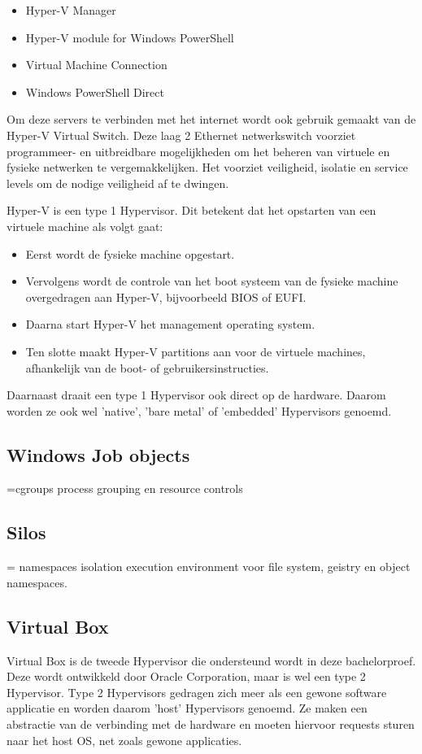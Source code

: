 \begin{itemize}[noitemsep]
	\item Hyper-V Manager
	\item Hyper-V module for Windows PowerShell
	\item Virtual Machine Connection
	\item Windows PowerShell Direct
\end{itemize}

Om deze servers te verbinden met het internet wordt ook gebruik gemaakt van de Hyper-V Virtual Switch. Deze laag 2 Ethernet netwerkswitch voorziet programmeer- en uitbreidbare mogelijkheden om het beheren van virtuele en fysieke netwerken te vergemakkelijken. Het voorziet veiligheid, isolatie en service levels om de nodige veiligheid af te dwingen.

Hyper-V is een type 1 Hypervisor. Dit betekent dat het opstarten van een virtuele machine als volgt gaat:
\begin{itemize}[noitemsep]
	\item Eerst wordt de fysieke machine opgestart.
	\item Vervolgens wordt de controle van het boot systeem van de fysieke machine overgedragen aan Hyper-V, bijvoorbeeld BIOS of EUFI.
	\item Daarna start Hyper-V het management operating system.
	\item Ten slotte maakt Hyper-V partitions aan voor de virtuele machines, afhankelijk van de boot- of gebruikersinstructies.
\end{itemize}
Daarnaast draait een type 1 Hypervisor ook direct op de hardware. Daarom worden ze ook wel 'native', 'bare metal' of 'embedded' Hypervisors genoemd.

\subsection{Windows Job objects}
=cgroups
process grouping en resource controls

\subsection{Silos}
= namespaces
isolation execution environment voor file system, geistry en object namespaces.

\subsection{Virtual Box}
Virtual Box is de tweede Hypervisor die ondersteund wordt in deze bachelorproef. Deze wordt ontwikkeld door Oracle Corporation, maar is wel een type 2 Hypervisor. Type 2 Hypervisors gedragen zich meer als een gewone software applicatie en worden daarom 'host' Hypervisors genoemd. Ze maken een abstractie van de verbinding met de hardware en moeten hiervoor requests sturen naar het host OS, net zoals gewone applicaties.

